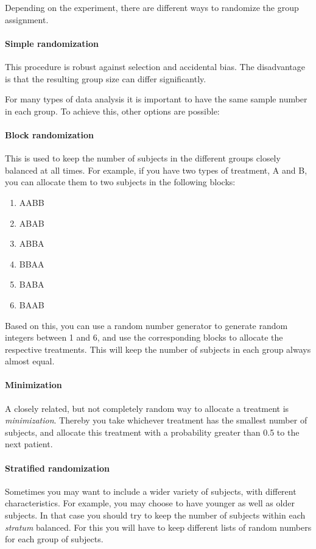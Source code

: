 Depending on the experiment, there are different ways to randomize the group assignment.

\paragraph{Simple randomization}
This procedure is robust against selection and accidental bias. The disadvantage is that the resulting group size can differ significantly.

For many types of data analysis it is important to have the same sample number in each group. To achieve this, other options are possible:

\paragraph{Block randomization}
This is used to keep the number of subjects in the different groups closely balanced at all times. For example, if you have two types of treatment, A and B, you can allocate them to two subjects in the following blocks:

\begin{enumerate}
  \item AABB
  \item ABAB
  \item ABBA
  \item BBAA
  \item BABA
  \item BAAB
\end{enumerate}

Based on this, you can use a random number generator to generate random integers between 1 and 6, and use the corresponding blocks to allocate the respective treatments. This will keep the number of subjects in each group always almost equal.

\paragraph{Minimization}
A closely related, but not completely random way to allocate a treatment is \emph{minimization}. Thereby you take whichever treatment has the smallest number of subjects, and allocate this treatment with a probability greater than 0.5 to the next patient.

\paragraph{Stratified randomization}
Sometimes you may want to include a wider variety of subjects, with different characteristics. For example, you may choose to have younger as well as older subjects. In that case you should try to keep the number of subjects within each \emph{stratum} balanced. For this you will have to keep different lists of random numbers for each group of subjects.

